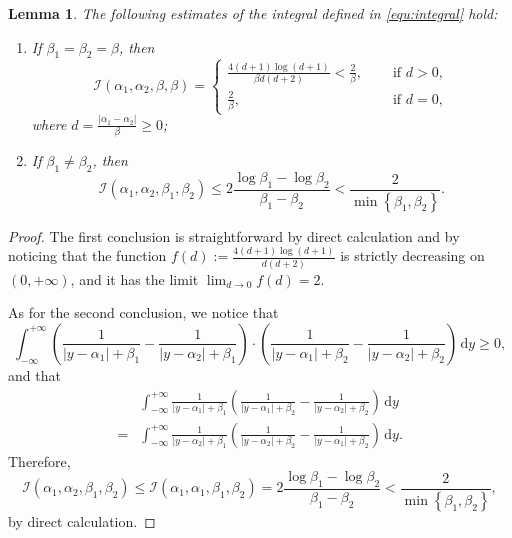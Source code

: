 \documentclass{article}
\theoremstyle{plain}%
\newtheorem{lemma}{Lemma}%
\theoremstyle{definition}%
\theoremstyle{remark}%
\newcommand{\cI}{\mathcal{I}}
\newcommand{\rd}{\mathrm{d}}
\newcommand{\+}[1]{{\bm{#1}}}
\begin{document}
\begin{lemma}\label{lemma:integral}
  The following estimates of the integral defined in 
  \cref{equ:integral} hold:
  \begin{enumerate}
    \item If $\beta_1 = \beta_2 = \beta$, then 
    \begin{displaymath}
      \cI(\alpha_1, \alpha_2, \beta, \beta) = 
      \begin{cases}
        \frac{4 (d + 1) \log(d + 1)}{\beta d (d + 2)} 
        < \frac{2}{\beta}, & \quad \text{ if } d > 0, \\
        \frac{2}{\beta}, & \quad \text{ if } d = 0,
      \end{cases}
    \end{displaymath}
    where $d = \frac{|\alpha_1 - \alpha_2|}{\beta} \ge 0$;
    \item If $\beta_1 \ne \beta_2$, then 
    \begin{displaymath}
      \cI(\alpha_1, \alpha_2, \beta_1, \beta_2) \le 
      2 \frac{\log \beta_1 - \log \beta_2}{\beta_1 - \beta_2} <
      \frac{2}{\min \left\{ \beta_1, \beta_2 \right\}}.
    \end{displaymath}
  \end{enumerate}
\end{lemma}

\begin{proof}
  The first conclusion is straightforward by direct calculation and 
  by noticing that the function 
  $f(d) := \frac{4 (d + 1) \log (d + 1)}{d (d + 2)}$ is strictly 
  decreasing on $(0, + \infty)$, and it has the limit 
  $\lim_{d \rightarrow 0} f(d) = 2$.

  As for the second conclusion, we notice that 
  \begin{displaymath}
    \int_{- \infty}^{+ \infty} 
    \left( \frac{1}{|y - \alpha_1| + \beta_1} 
    - \frac{1}{|y - \alpha_2| + \beta_1} \right) \cdot 
    \left( \frac{1}{|y - \alpha_1| + \beta_2} 
    - \frac{1}{|y - \alpha_2| + \beta_2} \right) \,\rd y \ge 0,
  \end{displaymath}
  and that 
  \begin{displaymath}
    \begin{aligned}
      & \int_{- \infty}^{+ \infty} \frac{1}{|y - \alpha_1| + \beta_1} 
      \left( \frac{1}{|y - \alpha_1| + \beta_2} - 
      \frac{1}{|y - \alpha_2| + \beta_2} \right) \,\rd y \\
      = & \int_{- \infty}^{+ \infty}
      \frac{1}{|y - \alpha_2| + \beta_1} 
      \left( \frac{1}{|y - \alpha_2| + \beta_2} - 
      \frac{1}{|y - \alpha_1| + \beta_2} \right) \,\rd y.
    \end{aligned}
  \end{displaymath}
  Therefore, 
  \begin{displaymath}
    \cI(\alpha_1, \alpha_2, \beta_1, \beta_2) \le 
    \cI(\alpha_1, \alpha_1, \beta_1, \beta_2) = 
    2 \frac{\log \beta_1 - \log \beta_2}{\beta_1 - \beta_2} <
    \frac{2}{\min \left\{ \beta_1, \beta_2 \right\}},
  \end{displaymath}
  by direct calculation.
\end{proof}
\end{document}
